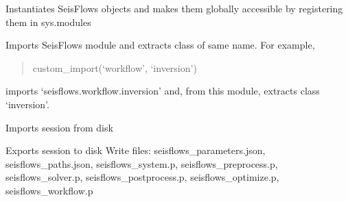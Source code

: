 \documentclass[letterpaper,10pt,english]{sphinxmanual}
\begin{document}

\begin{fulllineitems}
\label{\detokenize{ref/seisflows:seisflows.config.config}}
Instantiates SeisFlows objects and makes them globally accessible by
registering them in sys.modules

\end{fulllineitems}


\begin{fulllineitems}
\label{\detokenize{ref/seisflows:seisflows.config.custom_import}}
Imports SeisFlows module and extracts class of same name. For example,
\begin{quote}

custom\_import(‘workflow’, ‘inversion’)
\end{quote}

imports ‘seisflows.workflow.inversion’ and, from this module, extracts
class ‘inversion’.

\end{fulllineitems}


\begin{fulllineitems}
\label{\detokenize{ref/seisflows:seisflows.config.load}}
Imports session from disk

\end{fulllineitems}


\begin{fulllineitems}
\label{\detokenize{ref/seisflows:seisflows.config.save}}
Exports session to disk
Write files:
seisflows\_parameters.json, seisflows\_paths.json, seisflows\_system.p,
seisflows\_preprocess.p, seisflows\_solver.p, seisflows\_postprocess.p,
seisflows\_optimize.p, seisflows\_workflow.p

\end{fulllineitems}
\end{document}
